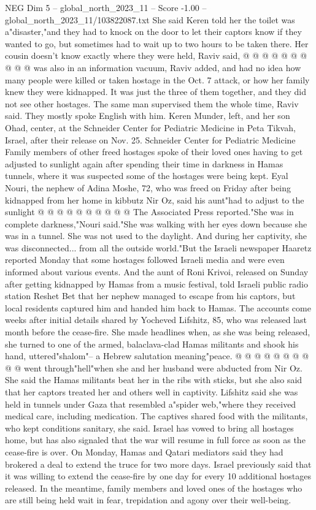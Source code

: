 \begin{textsample}{NEG Dim 5 – global\_north\_2023\_11 – Score -1.00 – global\_north\_2023\_11/103822087.txt}
She said Keren told her the toilet was a"disaster,"and they had to knock on the door to let their captors know if they wanted to go, but sometimes had to wait up to two hours to be taken there.
Her cousin doesn't know exactly where they were held, Raviv said, @ @ @ @ @ @ @ @ @ @ was also in an information vacuum, Raviv added, and had no idea how many people were killed or taken hostage in the Oct. 7 attack, or how her family knew they were kidnapped.
It was just the three of them together, and they did not see other hostages.
The same man supervised them the whole time, Raviv said.
They mostly spoke English with him.
Keren Munder, left, and her son Ohad, center, at the Schneider Center for Pediatric Medicine in Peta Tikvah, Israel, after their release on Nov. 25.
Schneider Center for Pediatric Medicine Family members of other freed hostages spoke of their loved ones having to get adjusted to sunlight again after spending their time in darkness in Hamas tunnels, where it was suspected some of the hostages were being kept.
Eyal Nouri, the nephew of Adina Moshe, 72, who was freed on Friday after being kidnapped from her home in kibbutz Nir Oz, said his aunt"had to adjust to the sunlight @ @ @ @ @ @ @ @ @ @ The Associated Press reported."She was in complete darkness,"Nouri said."She was walking with her eyes down because she was in a tunnel.
She was not used to the daylight.
And during her captivity, she was disconnected... from all the outside world."But the Israeli newspaper Haaretz reported Monday that some hostages followed Israeli media and were even informed about various events.
And the aunt of Roni Krivoi, released on Sunday after getting kidnapped by Hamas from a music festival, told Israeli public radio station Reshet Bet that her nephew managed to escape from his captors, but local residents captured him and handed him back to Hamas.
The accounts come weeks after initial details shared by Yocheved Lifshitz, 85, who was released last month before the cease-fire.
She made headlines when, as she was being released, she turned to one of the armed, balaclava-clad Hamas militants and shook his hand, uttered"shalom"-- a Hebrew salutation meaning"peace. @ @ @ @ @ @ @ @ @ @ went through"hell"when she and her husband were abducted from Nir Oz.
She said the Hamas militants beat her in the ribs with sticks, but she also said that her captors treated her and others well in captivity.
Lifshitz said she was held in tunnels under Gaza that resembled a"spider web,"where they received medical care, including medication.
The captives shared food with the militants, who kept conditions sanitary, she said.
Israel has vowed to bring all hostages home, but has also signaled that the war will resume in full force as soon as the cease-fire is over.
On Monday, Hamas and Qatari mediators said they had brokered a deal to extend the truce for two more days.
Israel previously said that it was willing to extend the cease-fire by one day for every 10 additional hostages released.
In the meantime, family members and loved ones of the hostages who are still being held wait in fear, trepidation and agony over their well-being.

\end{textsample}
